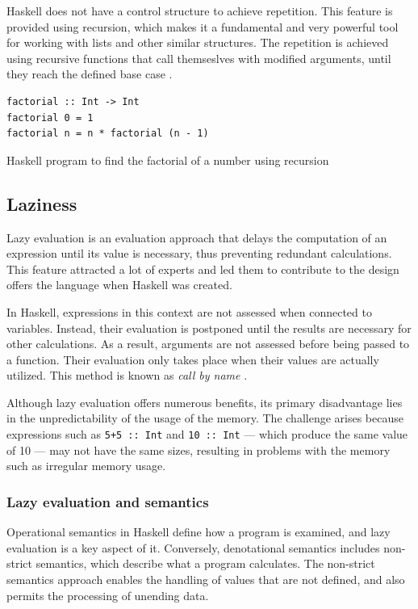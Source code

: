 \documentclass[a4paper, titlepage, twoside]{article}
\begin{document}
Haskell does not have a control structure to achieve repetition. This feature is provided using recursion, which makes it a fundamental and very powerful tool for working with lists and other similar structures. The repetition is achieved using recursive functions that call themseslves with modified arguments, until they reach the defined base case \autocite{kremerCPSC449Programming2015}.

\begin{listing}[htbp]
\begin{verbatim}
factorial :: Int -> Int
factorial 0 = 1
factorial n = n * factorial (n - 1)
\end{verbatim}
\caption{Haskell program to find the factorial of a number using recursion}
\end{listing}

\subsection{Laziness}
\label{sec:org1a51f0a}

Lazy evaluation is an evaluation approach that delays the computation of an expression until its value is necessary, thus preventing redundant calculations. This feature attracted a lot of experts and led them to contribute to the design offers the language when Haskell was created.

In Haskell, expressions in this context are not assessed when connected to variables. Instead, their evaluation is postponed until the results are necessary for other calculations. As a result, arguments are not assessed before being passed to a function. Their evaluation only takes place when their values are actually utilized. This method is known as \emph{call by name} \autocite{haskellwikiHaskellHaskellWiki2023}.

Although lazy evaluation offers numerous benefits, its primary disadvantage lies in the unpredictability of the usage of the memory. The challenge arises because expressions such as \texttt{5+5 :: Int} and \texttt{10 :: Int} --- which produce the same value of 10 --- may not have the same sizes, resulting in problems with the memory such as irregular memory usage.

\subsubsection{Lazy evaluation and semantics}
\label{sec:orgf5fd041}

Operational semantics in Haskell define how a program is examined, and lazy evaluation is a key aspect of it. Conversely, denotational semantics includes non-strict semantics, which describe what a program calculates. The non-strict semantics approach enables the handling of values that are not defined, and also permits the processing of unending data.
\end{document}
